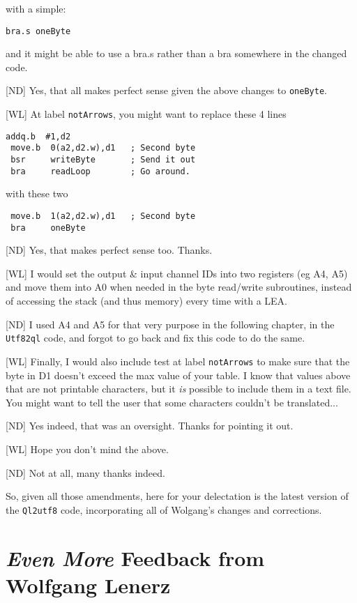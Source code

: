 with a simple:

\begin{lstlisting}[numbers=none]
 bra.s oneByte
\end{lstlisting}
 
and it might be able to use a bra.s rather than a bra somewhere in the changed code.

[ND] Yes, that all makes perfect sense given the above changes to \texttt{oneByte}.

[WL] At label \texttt{notArrows}, you might want to replace these 4 lines

\begin{lstlisting}[numbers=none]
 addq.b  #1,d2
 move.b  0(a2,d2.w),d1   ; Second byte
 bsr     writeByte       ; Send it out
 bra     readLoop        ; Go around.
\end{lstlisting}

with these two

\begin{lstlisting}
 move.b  1(a2,d2.w),d1   ; Second byte
 bra     oneByte
\end{lstlisting}
 
[ND] Yes, that makes perfect sense too. Thanks.


[WL] I would set the output \& input channel IDs into two registers (eg A4, A5) and move them into A0 when needed in the byte read/write subroutines, instead of accessing the stack (and thus memory) every time with a LEA.

[ND] I used A4 and A5 for that very purpose in the following chapter, in the \texttt{Utf82ql} code, and forgot to go back and fix this code to do the same.

[WL] Finally, I would also include  test at label \texttt{notArrows} to make sure that the byte in D1 doesn't exceed the max value of your table. I know that values above that are not printable characters, but it \emph{is} possible to include them in a text file. You might want to tell the user that some characters couldn't be translated...

[ND] Yes indeed, that was an oversight. Thanks for pointing it out.

[WL] Hope you don't mind the above.

[ND] Not at all, many thanks indeed.

So, given all those amendments, here for your delectation is the latest version of the \texttt{Ql2utf8} code, incorporating all of Wolgang's changes and corrections.


\section{\emph{Even More} Feedback from Wolfgang Lenerz}
	
